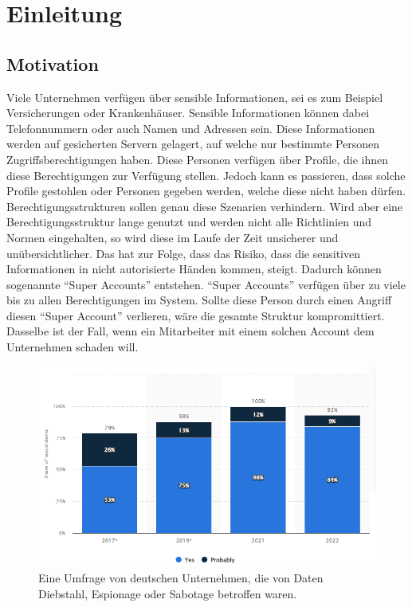 \chapter{Einleitung}
\label{ch:intro}

\section{Motivation}
\label{sec:intro:motivation}
Viele Unternehmen verfügen über sensible Informationen, sei es zum Beispiel Versicherungen oder Krankenhäuser.
Sensible Informationen können dabei Telefonnummern oder auch Namen und Adressen sein.
Diese Informationen werden auf gesicherten Servern gelagert, auf welche nur bestimmte Personen Zugriffsberechtigungen haben.
Diese Personen verfügen über Profile, die ihnen diese Berechtigungen zur Verfügung stellen.
Jedoch kann es passieren, dass solche Profile gestohlen oder Personen gegeben werden, welche diese nicht haben dürfen.
Berechtigungsstrukturen sollen genau diese Szenarien verhindern.
Wird aber eine Berechtigungsstruktur lange genutzt und werden nicht alle Richtlinien und Normen eingehalten, so wird diese im Laufe der Zeit unsicherer und unübersichtlicher.
Das hat zur Folge, dass das Risiko, dass die sensitiven Informationen in nicht autorisierte Händen kommen, steigt.
Dadurch können sogenannte "`Super Accounts"' entstehen.
"`Super Accounts"' verfügen über zu viele bis zu allen Berechtigungen im System.
Sollte diese Person durch einen Angriff diesen "`Super Account"' verlieren, wäre die gesamte Struktur kompromittiert.
Dasselbe ist der Fall, wenn ein Mitarbeiter mit einem solchen Account dem Unternehmen schaden will.

\begin{figure}[h!]
 \centering
 \includegraphics[width=1\textwidth]{gfx/Picture/Cyber_Crime.PNG}
 \caption{Eine Umfrage von deutschen Unternehmen, die von Daten Diebstahl, Espionage oder Sabotage betroffen waren. \cite{Stat22}}
 \label{fig:Crime}
\end{figure}

